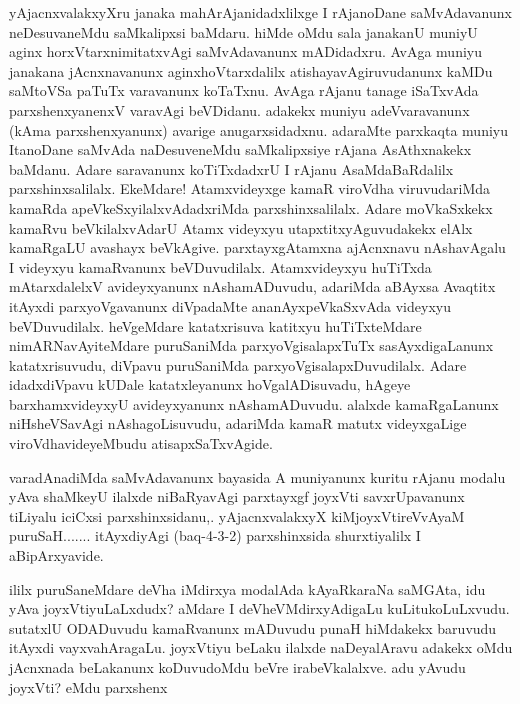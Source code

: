 
\begin{artha}
yAjacnxvalakxyXru janaka mahArAjanidadxlilxge I rAjanoDane saMvAdavanunx neDesuvaneMdu saMkalipxsi baMdaru. hiMde oMdu sala janakanU muniyU aginx horxVtarxnimitatxvAgi saMvAdavanunx mADidadxru. AvAga muniyu janakana jAcnxnavanunx aginxhoVtarxdalilx atishayavAgiruvudanunx kaMDu saMtoVSa paTuTx varavanunx koTaTxnu. AvAga rAjanu tanage iSaTxvAda parxshenxyanenxV varavAgi beVDidanu. adakekx muniyu adeVvaravanunx (kAma parxshenxyanunx) avarige anugarxsidadxnu. adaraMte parxkaqta muniyu ItanoDane saMvAda naDesuveneMdu saMkalipxsiye rAjana AsAthxnakekx baMdanu. Adare saravanunx koTiTxdadxrU I rAjanu AsaMdaBaRdalilx parxshinxsalilalx. EkeMdare! Atamxvideyxge kamaR viroVdha viruvudariMda kamaRda apeVkeSxyilalxvAdadxriMda parxshinxsalilalx. Adare moVkaSxkekx kamaRvu beVkilalxvAdarU Atamx videyxyu utapxtitxyAguvudakekx elAlx kamaRgaLU avashayx beVkAgive. parxtayxgAtamxna ajAcnxnavu nAshavAgalu I videyxyu kamaRvanunx beVDuvudilalx. Atamxvideyxyu huTiTxda mAtarxdalelxV avideyxyanunx nAshamADuvudu, adariMda aBAyxsa Avaqtitx itAyxdi parxyoVgavanunx diVpadaMte ananAyxpeVkaSxvAda videyxyu beVDuvudilalx. heVgeMdare katatxrisuva katitxyu huTiTxteMdare nimARNavAyiteMdare puruSaniMda parxyoVgisalapxTuTx sasAyxdigaLanunx katatxrisuvudu, diVpavu puruSaniMda parxyoVgisalapxDuvudilalx. Adare idadxdiVpavu kUDale katatxleyanunx hoVgalADisuvadu, hAgeye barxhamxvideyxyU avideyxyanunx nAshamADuvudu. alalxde kamaRgaLanunx niHsheVSavAgi nAshagoLisuvudu, adariMda kamaR matutx videyxgaLige viroVdhavideyeMbudu atisapxSaTxvAgide. 
\end{artha}%

\begin{artha}
varadAnadiMda saMvAdavanunx bayasida A muniyanunx kuritu rAjanu modalu yAva shaMkeyU ilalxde niBaRyavAgi parxtayxgf joyxVti savxrUpavanunx tiLiyalu iciCxsi parxshinxsidanu,. yAjacnxvalakxyX kiMjoyxVtireVvAyaM puruSaH.......  itAyxdiyAgi (baq-4-3-2) parxshinxsida shurxtiyalilx I aBipArxyavide.
\end{artha}


\begin{artha}
ililx puruSaneMdare deVha iMdirxya modalAda kAyaRkaraNa saMGAta, idu yAva joyxVtiyuLaLxdudx? aMdare I deVheVMdirxyAdigaLu kuLitukoLuLxvudu. sutatxlU ODADuvudu kamaRvanunx mADuvudu punaH hiMdakekx baruvudu itAyxdi vayxvahAragaLu. joyxVtiyu beLaku ilalxde naDeyalAravu adakekx oMdu jAcnxnada beLakanunx koDuvudoMdu beVre irabeVkalalxve. adu yAvudu joyxVti? eMdu parxshenx 
\end{artha}

